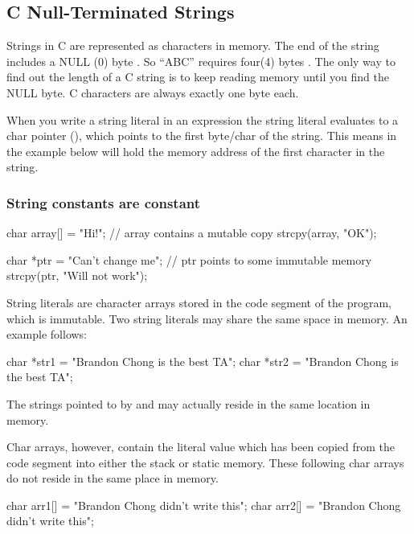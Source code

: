 \subsection{C Null-Terminated Strings}

Strings in C are represented as characters in memory. The end of the string includes a NULL (0) byte \cite{CITATION_NEEDED}. So ``ABC'' requires four(4) bytes .
The only way to find out the length of a C string is to keep reading memory until you find the NULL byte. C characters are always exactly one byte each.

When you write a string literal  in an expression the string literal evaluates to a char pointer (), which points to the first byte/char of the string. This means  in the example below will hold the memory address of the first character in the string.

\subsubsection{String constants are constant}

\begin{code}[language=C]
char array[] = "Hi!"; // array contains a mutable copy 
strcpy(array, "OK");

char *ptr = "Can't change me"; // ptr points to some immutable memory
strcpy(ptr, "Will not work");
\end{code}

String literals are character arrays stored in the code segment of the program, which is immutable. Two string literals may share the same space in memory. An example follows:

\begin{code}[language=C]
char *str1 = "Brandon Chong is the best TA";
char *str2 = "Brandon Chong is the best TA";
\end{code}

The strings pointed to by  and  may actually reside in the same location in memory.

Char arrays, however, contain the literal value which has been copied from the code segment into either the stack or static memory. These following char arrays do not reside in the same place in memory.

\begin{code}[language=C]
char arr1[] = "Brandon Chong didn't write this";
char arr2[] = "Brandon Chong didn't write this";
\end{code}

